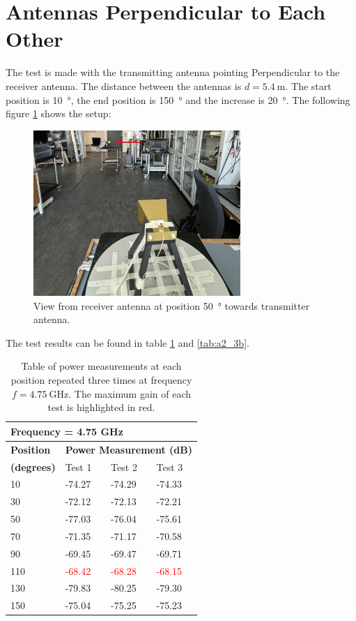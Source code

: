 \section{Antennas Perpendicular to Each Other} \label{s:test3}
The test is made with the transmitting antenna pointing Perpendicular to the receiver antenna. The distance between the antennas is $d=\SI{5.4}{\meter}$. The start position is \SI{10}{\degree}, the end position is \SI{150}{\degree} and the increase is \SI{20}{\degree}. The following figure \ref{fig:a2_3} shows the setup:
\begin{figure}[H]
    \centering
    \includegraphics[width=0.7\textwidth]{figures/test_los_perpendicular.JPG}
    \caption{View from receiver antenna at position \SI{50}{\degree} towards transmitter antenna.} \label{fig:a2_3}
\end{figure}

The test results can be found in table \ref{tab:a2_3a} and \ref{tab:a2_3b}.
\begin{table}[H]
    \centering
    \begin{tabular}{l|l|l|l}
        \multicolumn{4}{l}{\textbf{Frequency = 4.75 GHz}}         \\
        \hline
        \textbf{Position} & \multicolumn{3}{l}{\textbf{Power Measurement (dB)}} \\
        \textbf{(degrees)}  & Test 1    & Test 2  & Test 3  \\
        \hline
        \hline
        10      & -74.27    & -74.29    & -74.33 \\
        30      & -72.12    & -72.13    & -72.21 \\
        50      & -77.03    & -76.04    & -75.61 \\
        70      & -71.35    & -71.17    & -70.58 \\
        90      & -69.45    & -69.47    & -69.71 \\
        110     & \textcolor{red}{-68.42}    & \textcolor{red}{-68.28}    & \textcolor{red}{-68.15} \\
        130     & -79.83    & -80.25    & -79.30 \\
        150     & -75.04    & -75.25    & -75.23
        \end{tabular}
    \caption{Table of power measurements at each position repeated three times at frequency $f=\SI{4.75}{\giga\hertz}$. The maximum gain of each test is highlighted in red.}
    \label{tab:a2_3a}
\end{table}

